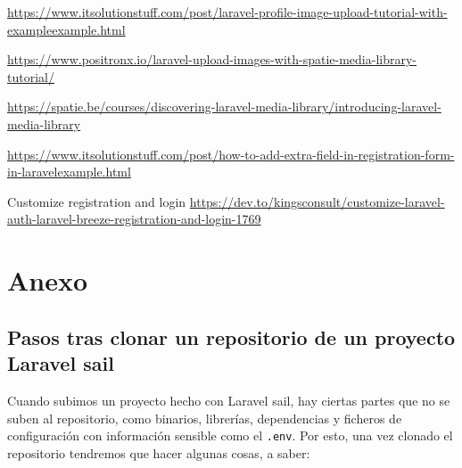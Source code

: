 \documentclass[11pt]{article}
\begin{document}
\url{https://www.itsolutionstuff.com/post/laravel-profile-image-upload-tutorial-with-exampleexample.html}

\url{https://www.positronx.io/laravel-upload-images-with-spatie-media-library-tutorial/}

\url{https://spatie.be/courses/discovering-laravel-media-library/introducing-laravel-media-library}

\url{https://www.itsolutionstuff.com/post/how-to-add-extra-field-in-registration-form-in-laravelexample.html}

Customize registration and login
\url{https://dev.to/kingsconsult/customize-laravel-auth-laravel-breeze-registration-and-login-1769}




\newpage

\section{Anexo}
\label{sec:org6621aec}
\subsection{Pasos tras clonar un repositorio de un proyecto Laravel sail}
\label{sec:org68bb758}
Cuando subimos un proyecto hecho con Laravel sail, hay ciertas partes
que no se suben al repositorio, como binarios, librerías, dependencias
y ficheros de configuración con información sensible como el
\texttt{.env}. Por esto, una vez clonado el repositorio tendremos que hacer
algunas cosas, a saber:
\end{document}
